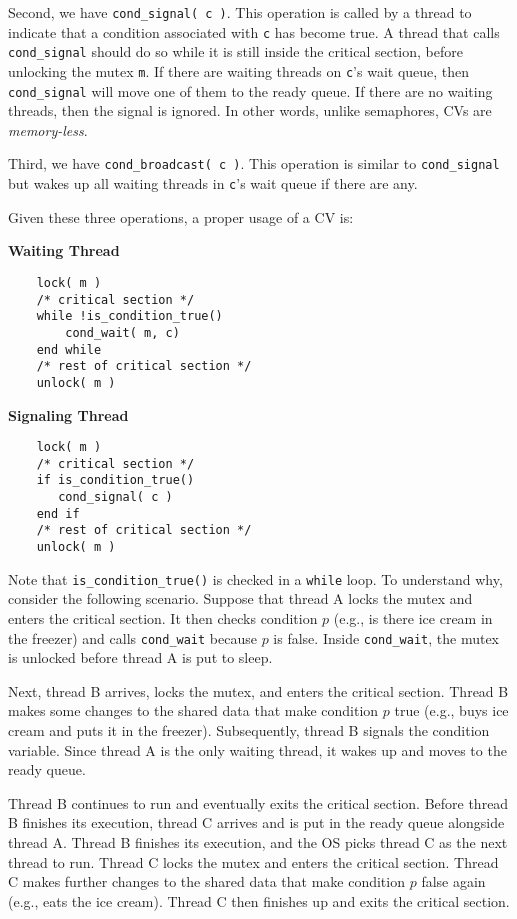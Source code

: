 Second, we have \texttt{cond\_signal( c )}.
This operation is called by a thread to indicate that a condition associated with \texttt{c} has become true.
A thread that calls \texttt{cond\_signal} should do so while it is still inside the critical section, before unlocking the mutex \texttt{m}.
If there are waiting threads on \texttt{c}'s wait queue, then \texttt{cond\_signal} will move one of them to the ready queue.
If there are no waiting threads, then the signal is ignored.
In other words, unlike semaphores, CVs are \emph{memory-less}.

Third, we have \texttt{cond\_broadcast( c )}.
This operation is similar to \texttt{cond\_signal} but wakes up all waiting threads in \texttt{c}'s wait queue if there are any.

Given these three operations, a proper usage of a CV is:

\begin{multicols}{2}
	\textbf{Waiting Thread}
	\begin{verbatim}
	lock( m )
	/* critical section */
	while !is_condition_true()
	    cond_wait( m, c)
	end while
	/* rest of critical section */
	unlock( m )

	\end{verbatim}
	\columnbreak
	\textbf{Signaling Thread}\vspace{-2em}
	\begin{verbatim}
	lock( m )
	/* critical section */
	if is_condition_true()
	   cond_signal( c )
	end if
	/* rest of critical section */
	unlock( m )
  \end{verbatim}
\end{multicols}

Note that \texttt{is\_condition\_true()} is checked in a \texttt{while} loop.
To understand why, consider the following scenario.
Suppose that thread A locks the mutex and enters the critical section.
It then checks condition $p$ (e.g., is there ice cream in the freezer) and calls \texttt{cond\_wait} because $p$ is false.
Inside \texttt{cond\_wait}, the mutex is unlocked before thread A is put to sleep.

Next, thread B arrives, locks the mutex, and enters the critical section.
Thread B makes some changes to the shared data that make condition $p$ true (e.g., buys ice cream and puts it in the freezer).
Subsequently, thread B signals the condition variable.
Since thread A is the only waiting thread, it wakes up and moves to the ready queue.

Thread B continues to run and eventually exits the critical section.
Before thread B finishes its execution, thread C arrives and is put in the ready queue alongside thread A.
Thread B finishes its execution, and the OS picks thread C as the next thread to run.
Thread C locks the mutex and enters the critical section.
Thread C makes further changes to the shared data that make condition $p$ false again (e.g., eats the ice cream).
Thread C then finishes up and exits the critical section.


